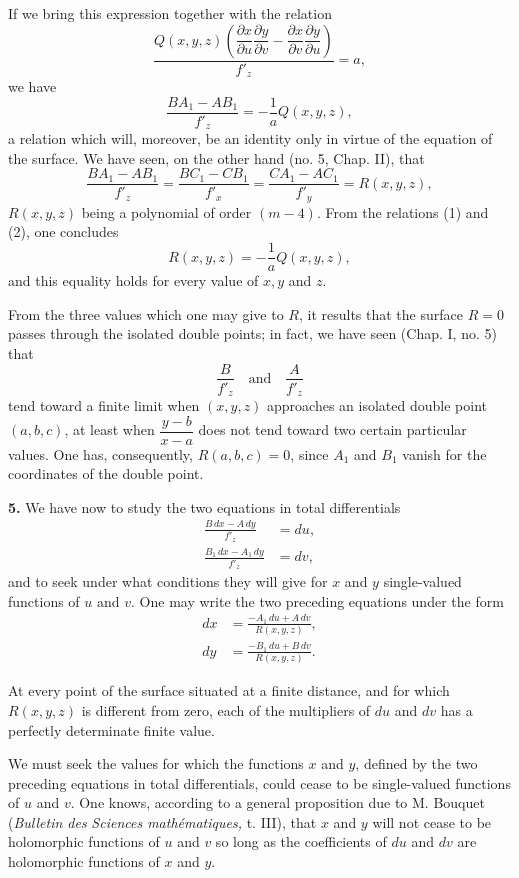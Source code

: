\documentclass{article}
\begin{document}
If we bring this expression together with the relation
\[
\frac{Q(x, y, z)\left(\dfrac{\partial x}{\partial u} \dfrac{\partial y}{\partial v} - \dfrac{\partial x}{\partial v} \dfrac{\partial y}{\partial u}\right)}{f'_{z}} = a,
\]
we have
\[
\frac{BA_{1} - AB_{1}}{f'_{z}} = -\frac{1}{a} Q(x, y, z),
\tag{1}
\]
a relation which will, moreover, be an identity only in virtue of the equation of the surface. We have seen, on the other hand (no. 5, Chap. II), that
\[
\frac{BA_{1} - AB_{1}}{f'_{z}} = \frac{BC_{1} - CB_{1}}{f'_{x}} = \frac{CA_{1} - AC_{1}}{f'_{y}} = R(x, y, z),
\tag{2}
\]
$R(x, y, z)$ being a polynomial of order $(m - 4)$. From the relations (1) and (2),
one concludes
\[
R(x, y, z) = -\frac{1}{a} Q(x, y, z),
\]
and this equality holds for every value of $x, y$ and $z$.

From the three values which one may give to $R$, it results that the surface $R = 0$ passes through the isolated double points; in fact, we have seen (Chap. I, no. 5) that
\[
\frac{B}{f'_{z}} \quad \text{and} \quad \frac{A}{f'_{z}}
\]
tend toward a finite limit when $(x, y, z)$ approaches an isolated double point $(a, b, c)$, at least when $\dfrac{y - b}{x - a}$ does not tend toward two certain particular values. One has, consequently, $R(a, b, c) = 0$, since $A_{1}$ and $B_{1}$ vanish for the coordinates of the double point.

\textbf{5.} We have now to study the two equations in total differentials
\[
\begin{aligned}
\frac{B\,dx - A\,dy}{f'_{z}} &= du, \\
\frac{B_{1}\,dx - A_{1}\,dy}{f'_{z}} &= dv,
\end{aligned}
\]
and to seek under what conditions they will give for $x$ and $y$ single-valued functions of $u$ and $v$. One may write the two preceding equations under the form
\[
\begin{aligned}
dx &= \frac{-A_{1}\,du + A\,dv}{R(x, y, z)}, \\
dy &= \frac{-B_{1}\,du + B\,dv}{R(x, y, z)}.
\end{aligned}
\]

At every point of the surface situated at a finite distance, and for which $R(x, y, z)$ is different from zero, each of the multipliers of $du$ and $dv$ has a perfectly determinate finite value.

We must seek the values for which the functions $x$ and $y$, defined by the two preceding equations in total differentials, could cease to be single-valued functions of $u$ and $v$. One knows, according to a general proposition due to M. Bouquet (\emph{Bulletin des}
\emph{Sciences mathématiques,} t. III), that $x$ and $y$ will not cease to be holomorphic functions of $u$ and $v$ so long as the coefficients of $du$ and $dv$ are holomorphic functions of $x$ and $y$.
\end{document}
